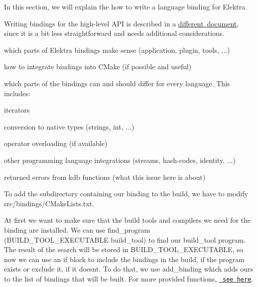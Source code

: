 In this section, we will explain the how to write a language binding for Elektra.

Writing bindings for the high-\/level A\+PI is described in a \mbox{\hyperlink{doc_tutorials_highlevel-bindings_md}{different document}}, since it is a bit less straightforward and needs additional considerations.


\begin{DoxyEnumerate}
\item which parts of Elektra bindings make sense (application, plugin, tools, ...)
\item how to integrate bindings into C\+Make (if possible and useful)
\item which parts of the bindings can and should differ for every language. This includes\+:
\begin{DoxyEnumerate}
\item iterators
\item conversion to native types (strings, int, ...)
\item operator overloading (if available)
\item other programming language integrations (streams, hash-\/codes, identity, ...)
\item returned errors from kdb functions (what this issue here is about)
\end{DoxyEnumerate}
\end{DoxyEnumerate}

To add the subdirectory containing our binding to the build, we have to modify {\ttfamily src/bindings/\+C\+Make\+Lists.\+txt}.


\begin{DoxyCode}{0}
\end{DoxyCode}


At first we want to make sure that the build tools and compilers we need for the binding are installed. We can use {\ttfamily find\+\_\+program (B\+U\+I\+L\+D\+\_\+\+T\+O\+O\+L\+\_\+\+E\+X\+E\+C\+U\+T\+A\+B\+LE build\+\_\+tool)} to find our {\ttfamily build\+\_\+tool} program. The result of the search will be stored in {\ttfamily B\+U\+I\+L\+D\+\_\+\+T\+O\+O\+L\+\_\+\+E\+X\+E\+C\+U\+T\+A\+B\+LE}, so now we can use an if block to include the bindings in the build, if the program exists or exclude it, if it doesn\textquotesingle{}t. To do that, we use {\ttfamily add\+\_\+binding} which adds ours to the list of bindings that will be built. For more provided functions, \href{/home/mpranj/workspace/libelektra/scripts/cmake/Modules/LibAddBinding.cmake}{\texttt{ see here}}.

